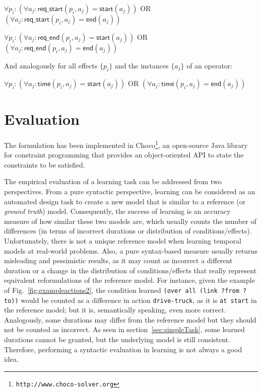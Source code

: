 \documentclass{ecai}
\newcommand{\start}{\mathsf{start}}%
\newcommand{\en}{\mathsf{end}}     %
\newcommand{\tim}{\mathsf{time}}   %
\newcommand{\reqs}{\mathsf{req\_{start}}} %
\newcommand{\reqe}{\mathsf{req\_{end}}}   %
\begin{document}
$\forall p_i: (\forall a_j: \reqs(p_i,a_j) = \start(a_j))$ OR $(\forall a_j: \reqs(p_i,a_j) = \en(a_j))$

$\forall p_i: (\forall a_j: \reqe(p_i,a_j) = \start(a_j))$ OR $(\forall a_j: \reqe(p_i,a_j) = \en(a_j))$

And analogously for all effects $\{p_i\}$ and the instances $\{a_j\}$ of an operator:

$\forall p_i: (\forall a_j: \tim(p_i,a_j) = \start(a_j))$ OR $(\forall a_j: \tim(p_i,a_j) = \en(a_j))$


\section{Evaluation}
\label{sec:evaluation}
The formulation has been implemented in \textsf{Choco}\footnote{\texttt{http://www.choco-solver.org}}, an open-source Java library for constraint programming that provides an object-oriented API to state the constraints to be satisfied.

The empirical evaluation of a learning task can be addressed from two perspectives. From a pure syntactic perspective, learning can be considered as an automated design task to create a new model that is similar to a reference (or {\em ground truth}) model. Consequently, the success of learning is an accuracy measure of how similar these two models are, which usually counts the number of differences (in terms of incorrect durations or distribution of conditions/effects). Unfortunately, there is not a unique reference model when learning temporal models at real-world problems. Also, a pure syntax-based measure usually returns misleading and pessimistic results, as it may count as incorrect a different duration or a change in the distribution of conditions/effects that really represent equivalent reformulations of the reference model. For instance, given the example of Fig.~\ref{fig:exampleactions2}, the condition learned \texttt{(over all (link ?from ?to))} would be counted as a difference in action \texttt{drive-truck}, as it is \texttt{at start} in the reference model; but it is, semantically speaking, even more correct. Analogously, some durations may differ from the reference model but they should not be counted as incorrect. As seen in section~\ref{sec:simpleTask}, some learned durations cannot be granted, but the underlying model is still consistent. Therefore, performing a syntactic evaluation in learning is not always a good idea.
\end{document}
